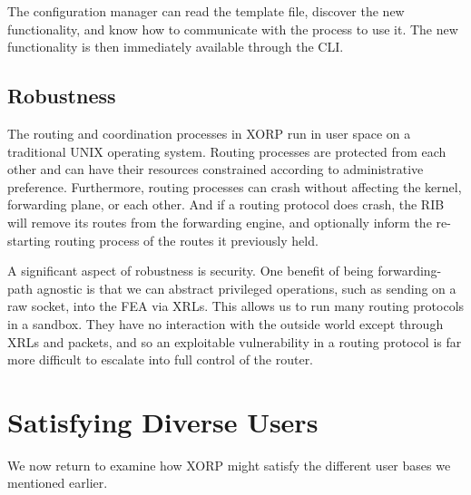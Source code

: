 The configuration manager can read the template file, discover the new
functionality, and know how to communicate with the process to use it.
The new functionality is then immediately available through the CLI.

\subsection{Robustness}

The routing and coordination processes in XORP run in user space on a
traditional UNIX operating system.  Routing processes are protected
from each other and can have their resources constrained according to
administrative preference.  Furthermore, routing processes can crash
without affecting the kernel, forwarding plane, or each other.  And if
a routing protocol does crash, the RIB will remove its routes
from the forwarding engine, and optionally inform the re-starting
routing process of the routes it previously held.


A significant aspect of robustness is security.  One benefit of
being forwarding-path agnostic is that we can abstract
privileged operations, such as sending on a raw socket, into
the FEA via XRLs.  This allows us to run many routing protocols
in a sandbox. They have no interaction with the outside world except
through XRLs and packets, and so an exploitable vulnerability in a routing
protocol is far more difficult to escalate into full control of the
router.


\section{Satisfying Diverse Users}

We now return to examine how XORP might satisfy the different user
bases we mentioned earlier.

